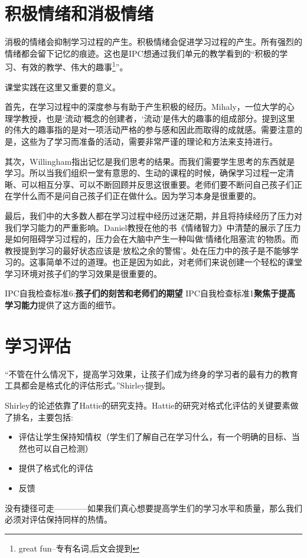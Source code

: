 \section{积极情绪和消极情绪}
    消极的情绪会抑制学习过程的产生。积极情绪会促进学习过程的产生。所有强烈的情绪都会留下记忆的痕迹。这也是IPC想通过我们单元的教学看到的“积极的学习、有效的教学、伟大的趣事\footnote{great fun--专有名词,后文会提到}”。\par
    课堂实践在这里又重要的意义。\par
    首先，在学习过程中的深度参与有助于产生积极的经历。Mihaly，一位大学的心理学教授，也是‘流动’概念的创建者，‘流动’是伟大的趣事的组成部分。提到这里的伟大的趣事指的是对一项活动严格的参与感和因此而取得的成就感。需要注意的是，这些为了学习而准备的活动，需要非常严谨的理论和方法来支持进行。\par
    其次，Willingham指出记忆是我们思考的结果。而我们需要学生思考的东西就是学习。所以当我们组织一堂有意思的、生动的课程的时候，确保学习过程一定清晰、可以相互分享、可以不断回顾并反思这很重要。老师们要不断问自己孩子们正在学什么而不是问自己孩子们正在做什么。因为学习本身是很重要的。\par
    最后，我们中的大多数人都在学习过程中经历过迷茫期，并且将持续经历了压力对我们学习能力的严重影响。Daniel教授在他的书《情绪智力》中清楚的展示了压力是如何阻碍学习过程的，压力会在大脑中产生一种叫做‘情绪化阻塞流’的物质。而教授提到学习的最好状态应该是‘放松之余的警惕’。处在压力中的孩子是不能够学习的。这事简单不过的道理。也正是因为如此，对老师们来说创建一个轻松的课堂学习环境对孩子们的学习效果是很重要的。\par
    IPC自我检查标准6:\textbf{孩子们的刻苦和老师们的期望}   IPC自我检查标准1\textbf{聚焦于提高学习能力}提供了这方面的细节。


\section{学习评估}
    “不管在什么情况下，提高学习效果，让孩子们成为终身的学习者的最有力的教育工具都会是格式化的评估形式。”Shirley提到。\par
     Shirley的论述依靠了Hattie的研究支持。Hattie的研究对格式化评估的关键要素做了排名，主要包括:
     \begin{itemize}
       \item 评估让学生保持知情权（学生们了解自己在学习什么，有一个明确的目标、当然也可以自己检测） 
       \item  提供了格式化的评估
       \item  反馈
     \end{itemize}  
     没有捷径可走————如果我们真心想要提高学生们的学习水平和质量，那么我们必须对评估保持同样的热情。

